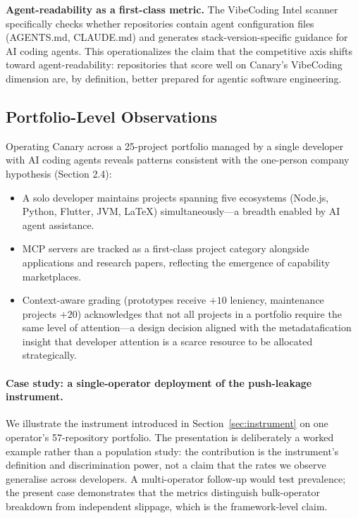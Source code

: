 \documentclass[sigconf, nonacm, anonymous=false]{acmart}
\begin{document}
\textbf{Agent-readability as a first-class metric.} The VibeCoding Intel scanner specifically checks whether repositories contain agent configuration files (AGENTS.md, CLAUDE.md) and generates stack-version-specific guidance for AI coding agents. This operationalizes the claim that the competitive axis shifts toward agent-readability: repositories that score well on Canary's VibeCoding dimension are, by definition, better prepared for agentic software engineering.

\subsection{Portfolio-Level Observations}
\label{sec:vignette}

Operating Canary across a 25-project portfolio managed by a single developer with AI coding agents reveals patterns consistent with the one-person company hypothesis (Section 2.4):

\begin{itemize}
  \item A solo developer maintains projects spanning five ecosystems (Node.js, Python, Flutter, JVM, LaTeX) simultaneously---a breadth enabled by AI agent assistance.
  \item MCP servers are tracked as a first-class project category alongside applications and research papers, reflecting the emergence of capability marketplaces.
  \item Context-aware grading (prototypes receive $+10$ leniency, maintenance projects $+20$) acknowledges that not all projects in a portfolio require the same level of attention---a design decision aligned with the metadatafication insight that developer attention is a scarce resource to be allocated strategically.
\end{itemize}

\paragraph{Case study: a single-operator deployment of the push-leakage instrument.}
We illustrate the instrument introduced in Section~\ref{sec:instrument} on one operator's 57-repository portfolio. The presentation is deliberately a worked example rather than a population study: the contribution is the instrument's definition and discrimination power, not a claim that the rates we observe generalise across developers. A multi-operator follow-up would test prevalence; the present case demonstrates that the metrics distinguish bulk-operator breakdown from independent slippage, which is the framework-level claim.
\end{document}
